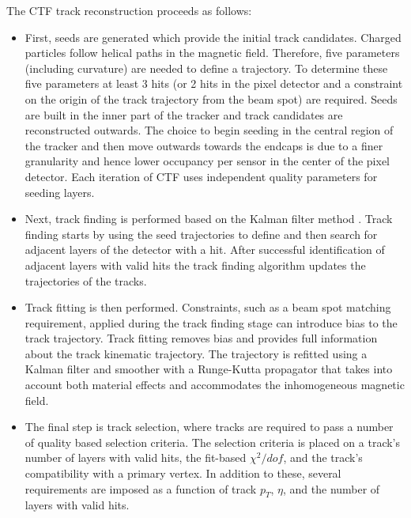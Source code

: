 The CTF track reconstruction proceeds as follows:
\begin{itemize}
\item First, seeds are generated which provide the initial track candidates.
Charged particles follow helical paths in the magnetic field. 
Therefore, five parameters (including curvature)
are needed to define a trajectory. To determine these five parameters at least
3 hits (or 2 hits in the pixel detector and a constraint on the origin of the track trajectory from the beam
spot) are required. Seeds are built in the inner part of the tracker
and track candidates are reconstructed outwards. 
The choice to begin seeding in the central region of the tracker and
then move outwards towards the endcaps is due to a finer granularity 
and hence lower occupancy per sensor in the center of the pixel detector. Each iteration of CTF
uses independent quality parameters for seeding layers. 
\item Next, track finding is performed based on the Kalman filter method \cite{KalmanFilter}.
Track finding starts by using the seed trajectories to define and then search
for adjacent layers of the detector with a hit. 
After successful identification of adjacent layers with valid hits 
the track finding algorithm updates the trajectories of the tracks. 
\item Track fitting is then performed. Constraints, such as a beam spot matching requirement, 
applied during the track finding stage can introduce bias to the track trajectory. Track
fitting removes bias and provides full information about the track kinematic trajectory\cite{TRK11001}.  
 The trajectory is refitted using a Kalman filter and smoother with
a Runge-Kutta propagator that takes into account both material effects and accommodates
the inhomogeneous magnetic field.
\item The final step is track selection, where tracks are required to pass a number of quality
based selection criteria. 
The selection criteria is placed on a track's number of layers 
with valid hits, the fit-based $\chi^{2}/dof$, and the track's compatibility
with a primary vertex. In addition to these, several requirements are
imposed as a function of track $p_{T}$, $\eta$, and the number of layers
with valid hits. 
\end{itemize}
